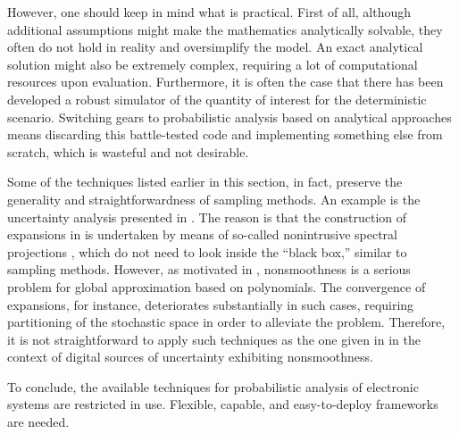 However, one should keep in mind what is practical. First of all, although
additional assumptions might make the mathematics analytically solvable, they
often do not hold in reality and oversimplify the model. An exact analytical
solution might also be extremely complex, requiring a lot of computational
resources upon evaluation. Furthermore, it is often the case that there has been
developed a robust simulator of the quantity of interest for the deterministic
scenario. Switching gears to probabilistic analysis based on analytical
approaches means discarding this battle-tested code and implementing something
else from scratch, which is wasteful and not desirable.

Some of the techniques listed earlier in this section, in fact, preserve the
generality and straightforwardness of sampling methods. An example is the
uncertainty analysis presented in \cite{ukhov2015}. The reason is that the
construction of  expansions in \cite{ukhov2015} is undertaken by means of
so-called nonintrusive spectral projections \cite{xiu2010}, which do not need to
look inside the ``black box,'' similar to sampling methods. However, as
motivated in , nonsmoothness is a serious problem for global
approximation based on polynomials. The convergence of  expansions, for
instance, deteriorates substantially in such cases, requiring partitioning of
the stochastic space in order to alleviate the problem. Therefore, it is not
straightforward to apply such techniques as the one given in \cite{ukhov2015} in
the context of digital sources of uncertainty exhibiting nonsmoothness.

To conclude, the available techniques for probabilistic analysis of electronic
systems are restricted in use. Flexible, capable, and easy-to-deploy frameworks
are needed.
